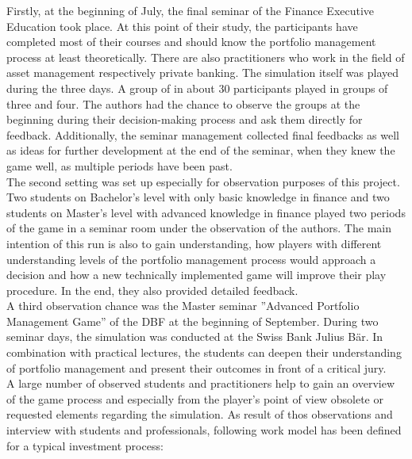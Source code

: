 Firstly, at the beginning of July, the final seminar of the Finance Executive Education took place. At this point of their study, the participants have completed most of their courses and should know the portfolio management process at least theoretically. There are also practitioners who work in the field of asset management respectively private banking. The simulation itself was played during the three days. A group of in about 30 participants played in groups of three and four. The authors had the chance to observe the groups at the beginning during their decision-making process and ask them directly for feedback. Additionally, the seminar management collected final feedbacks as well as ideas for further development at the end of the seminar, when they knew the game well, as multiple periods have been past. \\

The second setting was set up especially for observation purposes of this project. Two students on Bachelor’s level with only basic knowledge in finance and two students on Master’s level with advanced knowledge in finance played two periods of the game in a seminar room under the observation of the authors. The main intention of this run is also to gain understanding, how players with different understanding levels of the portfolio management process would approach a decision and how a new technically implemented game will improve their play procedure. In the end, they also provided detailed feedback. \\

A third observation chance was the Master seminar ''Advanced Portfolio Management Game'' of the DBF at the beginning of September. During two seminar days, the simulation was conducted at the Swiss Bank Julius Bär. In combination with practical lectures, the students can deepen their understanding of portfolio management and present their outcomes in front of a critical jury. \\

A large number of observed students and practitioners help to gain an overview of the game process and especially from the player’s point of view obsolete or requested elements regarding the simulation. As result of thos observations and interview with students and professionals, following work model has been defined for a typical investment process: \\

